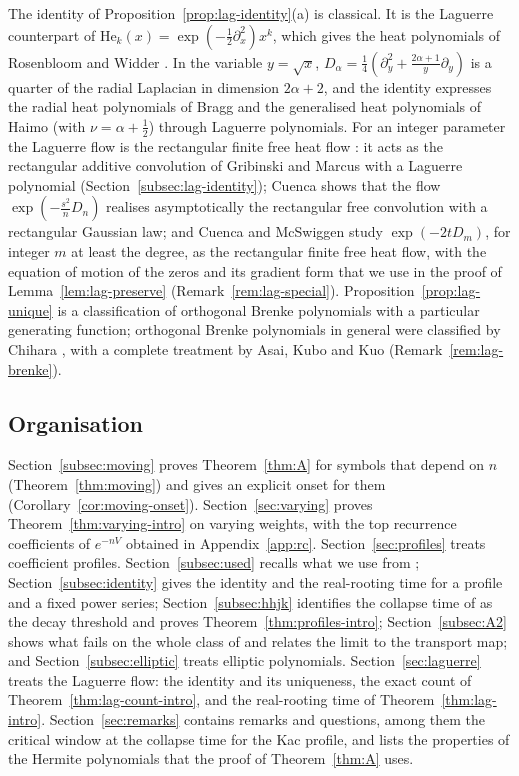 \documentclass[11pt]{amsart}
\theoremstyle{definition}
\theoremstyle{remark}
\numberwithin{equation}{section}
\newcommand{\He}{\mathrm{He}}
\begin{document}
The identity of Proposition~\ref{prop:lag-identity}(a) is classical. It is the Laguerre counterpart of $\He_k(x)=\exp(-\frac12\partial_x^2)x^k$, which gives the heat polynomials of Rosenbloom and Widder \cite{RW}. In the variable $y=\sqrt x$, $D_\alpha=\frac14(\partial_y^2+\frac{2\alpha+1}y\partial_y)$ is a quarter of the radial Laplacian in dimension $2\alpha+2$, and the identity expresses the radial heat polynomials of Bragg \cite{Br} and the generalised heat polynomials of Haimo \cite{Ha} (with $\nu=\alpha+\frac12$) through Laguerre polynomials.
For an integer parameter the Laguerre flow is the rectangular finite free heat flow \cite{Cu,CM,GM}: it acts as the rectangular additive convolution of Gribinski and Marcus with a Laguerre polynomial (Section~\ref{subsec:lag-identity}); Cuenca \cite{Cu} shows that the flow $\exp(-\frac{s^2}nD_n)$ realises asymptotically the rectangular free convolution with a rectangular Gaussian law; and Cuenca and McSwiggen \cite{CM} study $\exp(-2tD_m)$, for integer $m$ at least the degree, as the rectangular finite free heat flow, with the equation of motion of the zeros and its gradient form that we use in the proof of Lemma~\ref{lem:lag-preserve} (Remark~\ref{rem:lag-special}). Proposition~\ref{prop:lag-unique} is a classification of orthogonal Brenke polynomials with a particular generating function; orthogonal Brenke polynomials in general were classified by Chihara \cite{Ch68,Ch71}, with a complete treatment by Asai, Kubo and Kuo \cite{AKK} (Remark~\ref{rem:lag-brenke}).

\subsection{Organisation}
Section~\ref{subsec:moving} proves Theorem~\ref{thm:A} for symbols that depend on $n$ (Theorem~\ref{thm:moving}) and gives an explicit onset for them (Corollary~\ref{cor:moving-onset}). Section~\ref{sec:varying} proves Theorem~\ref{thm:varying-intro} on varying weights, with the top recurrence coefficients of $e^{-nV}$ obtained in Appendix~\ref{app:rc}. Section~\ref{sec:profiles} treats coefficient profiles. Section~\ref{subsec:used} recalls what we use from \cite{Main}; Section~\ref{subsec:identity} gives the identity and the real-rooting time for a profile and a fixed power series; Section~\ref{subsec:hhjk} identifies the collapse time of \cite{HHJK} as the decay threshold and proves Theorem~\ref{thm:profiles-intro}; Section~\ref{subsec:A2} shows what fails on the whole class of \cite{HHJK} and relates the limit to the transport map; and Section~\ref{subsec:elliptic} treats elliptic polynomials. Section~\ref{sec:laguerre} treats the Laguerre flow: the identity and its uniqueness, the exact count of Theorem~\ref{thm:lag-count-intro}, and the real-rooting time of Theorem~\ref{thm:lag-intro}. Section~\ref{sec:remarks} contains remarks and questions, among them the critical window at the collapse time for the Kac profile, and lists the properties of the Hermite polynomials that the proof of Theorem~\ref{thm:A} uses.
\end{document}
